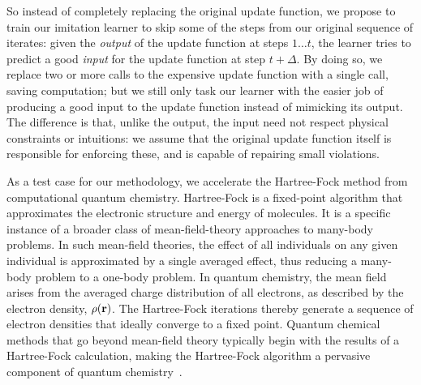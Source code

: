 \documentclass[twoside,11pt]{article}
\begin{document}
So instead of completely replacing the original update function, we propose to train our imitation learner to skip some of the steps from our original sequence of iterates: given the \emph{output} of the update function at steps $1\ldots t$, the learner tries to predict a good \emph{input} for the update function at step $t+\Delta$.  By doing so, we replace two or more calls to the expensive update function with a single call, saving computation; but we still only task our learner with the easier job of producing a good input to the update function instead of mimicking its output.  The difference is that, unlike the output, the input need not respect physical constraints or intuitions: we assume that the original update function itself is responsible for enforcing these, and is capable of repairing small violations.


As a test case for our methodology, we accelerate the Hartree-Fock method from computational quantum chemistry. Hartree-Fock is a fixed-point algorithm that approximates the electronic structure and energy of molecules.  It is a specific instance of a broader class of mean-field-theory approaches to many-body problems. In such mean-field theories, the effect of all individuals on any given individual is approximated by a single averaged effect, thus reducing a many-body problem to a one-body problem. In quantum chemistry, the mean field arises from the averaged charge distribution of all electrons, as described by the electron density, $\rho({\bf r})$. The Hartree-Fock iterations thereby generate a sequence of electron densities that ideally converge to a fixed point. Quantum chemical methods that go beyond mean-field theory typically begin with the results of a Hartree-Fock calculation, making the Hartree-Fock algorithm a pervasive component of quantum chemistry~\citep{cook}.
\end{document}
